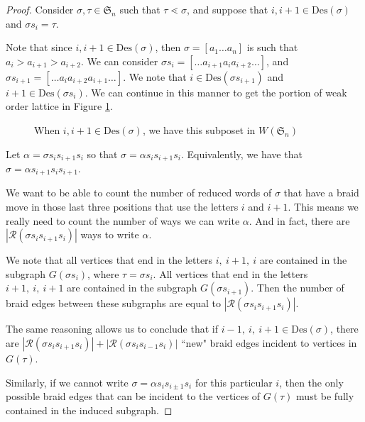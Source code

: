 \documentclass[11pt,reqno]{amsart}
\theoremstyle{definition}
\theoremstyle{notation}
\newcommand{\Des}{\text{Des}}
\newcommand{\calR}{\mathcal{R}}
\begin{document}
\begin{proof}
Consider $\sigma, \tau \in \mathfrak{S}_n$ such that $\tau \lessdot \sigma $, and suppose that $ i, i+1\in \Des(\sigma)$ and $\sigma s_i=\tau $. 

Note that since $i,i+1\in \Des(\sigma)$, then $\sigma = [a_1\ldots a_n]$ is such that $a_i>a_{i+1}>a_{i+2}$. We can consider $\sigma s_i= [\ldots  a_{i+1}a_ia_{i+2}\ldots] $, and $\sigma s_{i+1} = [\ldots  a_ia_{i+2}a_{i+1}\ldots]$. We note that $i\in \Des(\sigma s_{i+1})$ and $i+1\in \Des(\sigma s_i)$. We can continue in this manner to get the portion of weak order lattice in Figure \ref{fig:i+1lattice}.

\begin{figure}[H]
\begin{center}
\vspace{0.1in}
\caption{When $i,i+1\in \Des(\sigma)$, we have this subposet in $W(\mathfrak{S}_n)$}
\label{fig:i+1lattice}
\end{center}
\end{figure}

Let $\alpha= \sigma s_is_{i+1}s_i$ so that $\sigma = \alpha s_is_{i+1}s_i$. Equivalently, we have that $\sigma=\alpha s_{i+1}s_is_{i+1}$. 

We want to be able to count the number of reduced words of $\sigma$ that have a braid move in those last three positions that use the letters $i$ and $i+1$. This means we really need to count the number of ways we can write $\alpha$. And in fact, there are $|\calR(\sigma s_is_{i+1}s_i)|$ ways to write $\alpha$.

We note that all vertices that end in the letters $i,~i+1,~i$ are contained in the subgraph $G(\sigma s_i)$, where $\tau = \sigma s_i$. All vertices that end in the letters $i+1,~i,~i+1$ are contained in the subgraph $G(\sigma s_{i+1})$. Then the number of braid edges between these subgraphs are equal to $|\calR(\sigma s_is_{i+1}s_i)|$.

The same reasoning allows us to conclude that if $i-1,~i,~i+1\in \Des(\sigma)$, there are $|\calR(\sigma s_is_{i+1}s_i)|+|\calR(\sigma s_is_{i-1}s_i)|$ ``new" braid edges incident to vertices in $G(\tau)$. 

Similarly, if we cannot write $\sigma =\alpha s_i s_{i\pm 1}s_i$ for this particular $i$, then the only possible braid edges that can be incident to the vertices of $G(\tau)$ must be fully contained in the induced subgraph.
\end{proof}
\end{document}
